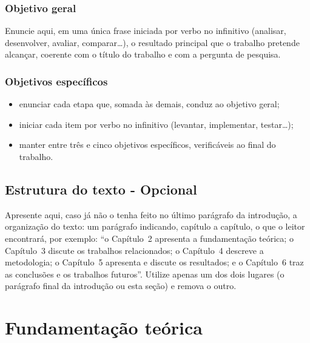 \documentclass[tcc,capa]{texifsap}
\begin{document}
\subsection{Objetivo geral}


Enuncie aqui, em uma única frase iniciada por verbo no infinitivo
(analisar, desenvolver, avaliar, comparar\ldots), o resultado principal
que o trabalho pretende alcançar, coerente com o título do trabalho e
com a pergunta de pesquisa.

\subsection{Objetivos específicos}


\begin{itemize}
\item enunciar cada etapa que, somada às demais, conduz ao objetivo
  geral;
\item iniciar cada item por verbo no infinitivo (levantar, implementar,
  testar\ldots);
\item manter entre três e cinco objetivos específicos, verificáveis ao
  final do trabalho.
\end{itemize}

\section{Estrutura do texto - Opcional}

Apresente aqui, caso já não o tenha feito no último parágrafo da
introdução, a organização do texto: um parágrafo indicando, capítulo a
capítulo, o que o leitor encontrará, por exemplo: ``o Capítulo~2
apresenta a fundamentação teórica; o Capítulo~3 discute os trabalhos
relacionados; o Capítulo~4 descreve a metodologia; o Capítulo~5
apresenta e discute os resultados; e o Capítulo~6 traz as conclusões e
os trabalhos futuros''. Utilize apenas um dos dois lugares (o parágrafo
final da introdução ou esta seção) e remova o outro.

\chapter{Fundamentação teórica}
\end{document}
